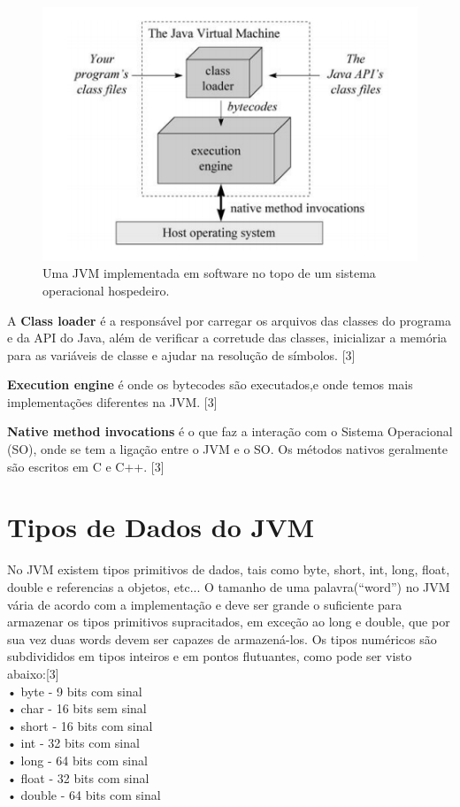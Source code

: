 \documentclass[12pt,a4paper,twoside]{report}
\begin{document}
\begin{figure}[!ht]
\centering
\caption{Uma JVM implementada em software no topo de um sistema operacional
hospedeiro.
      \label{fig:2}}
\includegraphics[scale=1]{imagens/jvm.png}
\end{figure}
 A \textbf{ Class loader} é a responsável por carregar os arquivos das classes do programa e da API
do Java, além de verificar a corretude das classes, inicializar a memória para as
variáveis de classe e ajudar na resolução de símbolos. [3]

\textbf{Execution engine} é onde os bytecodes são executados,e onde temos mais implementações
diferentes na JVM. [3]

\textbf{Native method invocations} é  o que faz a interação com o Sistema Operacional (SO),
onde se tem a ligação entre o JVM e o SO. Os métodos nativos geralmente são
escritos em C e C++. [3]

\section{Tipos de Dados do JVM}
No JVM existem tipos primitivos de dados, tais como byte, short, int, long, float, double e
referencias a objetos, etc... O tamanho de uma palavra(“word”) no JVM vária de acordo com a
implementação e deve ser grande o suficiente para armazenar os tipos primitivos supracitados, em
exceção ao long e double, que por sua vez duas words devem ser capazes de armazená-los.
Os tipos numéricos são subdivididos em tipos inteiros e em pontos flutuantes, como pode ser
visto abaixo:[3]\\
• byte - 9 bits com sinal\\
• char - 16 bits sem sinal\\
• short - 16 bits com sinal\\
• int - 32 bits com sinal\\
• long - 64 bits com sinal\\
• float - 32 bits com sinal\\
• double - 64 bits com sinal\\
\end{document}
